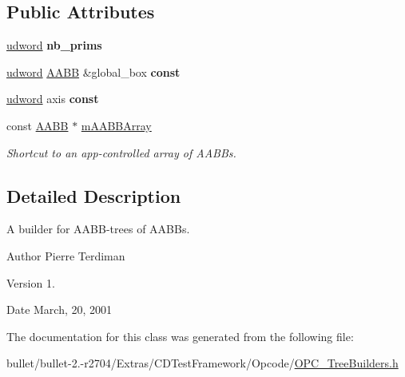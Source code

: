 \subsection*{Public Attributes}
\begin{DoxyCompactItemize}
\item 
\hypertarget{class_a_a_b_b_tree_of_a_a_b_bs_builder_a67b547425865dfd0666bcb25b9db8978}{\hyperlink{_ice_types_8h_a44c6f1920ba5551225fb534f9d1a1733}{udword} {\bfseries nb\+\_\+prims}}\label{class_a_a_b_b_tree_of_a_a_b_bs_builder_a67b547425865dfd0666bcb25b9db8978}

\item 
\hypertarget{class_a_a_b_b_tree_of_a_a_b_bs_builder_aab7fd0453729c3c2bccbde62cc45ee5f}{\hyperlink{_ice_types_8h_a44c6f1920ba5551225fb534f9d1a1733}{udword} \hyperlink{class_a_a_b_b}{A\+A\+B\+B} \&global\+\_\+box {\bfseries const}}\label{class_a_a_b_b_tree_of_a_a_b_bs_builder_aab7fd0453729c3c2bccbde62cc45ee5f}

\item 
\hypertarget{class_a_a_b_b_tree_of_a_a_b_bs_builder_af4e33d234e9361e05c9c573fe75cd556}{\hyperlink{_ice_types_8h_a44c6f1920ba5551225fb534f9d1a1733}{udword} axis {\bfseries const}}\label{class_a_a_b_b_tree_of_a_a_b_bs_builder_af4e33d234e9361e05c9c573fe75cd556}

\item 
\hypertarget{class_a_a_b_b_tree_of_a_a_b_bs_builder_af9744ff347031aa034de95b421a44c5a}{const \hyperlink{class_a_a_b_b}{A\+A\+B\+B} $\ast$ \hyperlink{class_a_a_b_b_tree_of_a_a_b_bs_builder_af9744ff347031aa034de95b421a44c5a}{m\+A\+A\+B\+B\+Array}}\label{class_a_a_b_b_tree_of_a_a_b_bs_builder_af9744ff347031aa034de95b421a44c5a}

\begin{DoxyCompactList}\small\item\em Shortcut to an app-\/controlled array of A\+A\+B\+Bs. \end{DoxyCompactList}\end{DoxyCompactItemize}


\subsection{Detailed Description}
A builder for A\+A\+B\+B-\/trees of A\+A\+B\+Bs.

\begin{DoxyAuthor}{Author}
Pierre Terdiman 
\end{DoxyAuthor}
\begin{DoxyVersion}{Version}
1. 
\end{DoxyVersion}
\begin{DoxyDate}{Date}
March, 20, 2001 
\end{DoxyDate}


The documentation for this class was generated from the following file\+:\begin{DoxyCompactItemize}
\item 
bullet/bullet-\/2.-\/r2704/\+Extras/\+C\+D\+Test\+Framework/\+Opcode/\hyperlink{_o_p_c___tree_builders_8h}{O\+P\+C\+\_\+\+Tree\+Builders.\+h}\end{DoxyCompactItemize}

